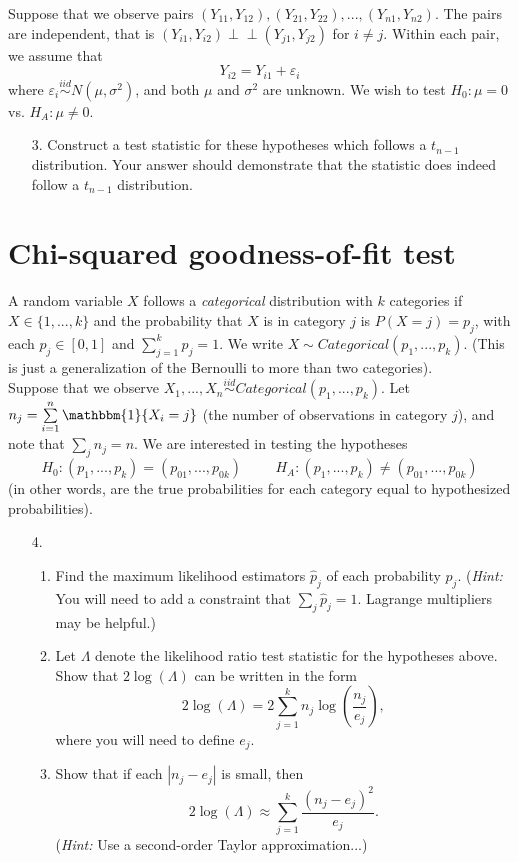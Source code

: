 \documentclass[11pt]{article}
\newcommand{\indep}{\perp \!\!\! \perp}
\begin{document}
\noindent Suppose that we observe pairs $(Y_{11}, Y_{12}), (Y_{21}, Y_{22}),...,(Y_{n1}, Y_{n2})$. The pairs are independent, that is $(Y_{i1}, Y_{i2}) \indep (Y_{j1}, Y_{j2})$ for $i \neq j$. Within each pair, we assume that
$$Y_{i2} = Y_{i1} + \varepsilon_i$$
where $\varepsilon_i \overset{iid}{\sim} N(\mu, \sigma^2)$, and both $\mu$ and $\sigma^2$ are unknown. We wish to test $H_0: \mu = 0$ vs. $H_A: \mu \neq 0$.

\begin{enumerate}
\item[3.] Construct a test statistic for these hypotheses which follows a $t_{n-1}$ distribution. Your answer should demonstrate that the statistic does indeed follow a $t_{n-1}$ distribution.
\end{enumerate}

\section*{Chi-squared goodness-of-fit test}

A random variable $X$ follows a \textit{categorical} distribution with $k$ categories if $X \in \{1,...,k\}$ and the probability that $X$ is in category $j$ is $P(X = j) = p_j$, with each $p_j \in [0,1]$ and $\sum \limits_{j=1}^k p_j = 1$. We write $X \sim Categorical(p_1,...,p_k)$. (This is just a generalization of the Bernoulli to more than two categories).\\

\noindent Suppose that we observe $X_1,...,X_n \overset{iid}{\sim} Categorical(p_1,...,p_k)$. Let $n_j = \sum \limits_{i=1}^n  \mathbbm{1}\{X_i = j\}$ (the number of observations in category $j$), and note that $\sum_j n_j = n$. We are interested in testing the hypotheses
$$H_0: (p_1,...,p_k) = (p_{01},...,p_{0k}) \hspace{1cm} H_A: (p_1,...,p_k) \neq (p_{01},...,p_{0k})$$
(in other words, are the true probabilities for each category equal to hypothesized probabilities).\\

\begin{enumerate}
\item[4.]

\begin{enumerate}
\item Find the maximum likelihood estimators $\widehat{p}_j$ of each probability $p_j$. (\textit{Hint:} You will need to add a constraint that $\sum_j \widehat{p}_j = 1$. Lagrange multipliers may be helpful.)

\item Let $\Lambda$ denote the likelihood ratio test statistic for the hypotheses above. Show that $2 \log(\Lambda)$ can be written in the form
$$2 \log(\Lambda) = 2 \sum \limits_{j=1}^k n_j \log \left( \frac{n_j}{e_j} \right),$$
where you will need to define $e_j$.

\item Show that if each $|n_j - e_j|$ is small, then 
$$2 \log(\Lambda) \approx \sum \limits_{j=1}^k \frac{(n_j - e_j)^2}{e_j}.$$
(\textit{Hint:} Use a second-order Taylor approximation...)
\end{enumerate}
\end{enumerate}
\end{document}

